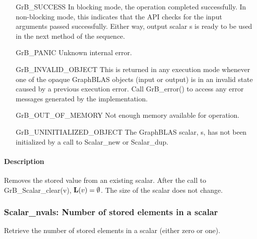 \begin{itemize}[leftmargin=2.1in]
    \item[{\sf GrB\_SUCCESS}]         In blocking mode, the operation completed
    successfully. In non-blocking mode, this indicates that the API checks 
    for the input arguments passed successfully. Either way, output scalar 
    {\sf s} is ready to be used in the next method of the sequence.

    \item[{\sf GrB\_PANIC}]           Unknown internal error.
    
    \item[{\sf GrB\_INVALID\_OBJECT}] This is returned in any execution mode 
    whenever one of the opaque GraphBLAS objects (input or output) is in an invalid 
    state caused by a previous execution error.  Call {\sf GrB\_error()} to access 
    any error messages generated by the implementation.

    \item[{\sf GrB\_OUT\_OF\_MEMORY}] Not enough memory available for operation.
    
    \item[{\sf GrB\_UNINITIALIZED\_OBJECT}]  The GraphBLAS scalar, {\sf s}, has 
    not been initialized by a call to {\sf Scalar\_new} or {\sf Scalar\_dup}.
    
\end{itemize}

\paragraph{Description}

Removes the stored value from an existing scalar. After the call to
{\sf GrB\_Scalar\_clear(v)}, 
$\mathbf{L}({v}) = \emptyset$. The size of the scalar does not change. 


\subsubsection{{\sf Scalar\_nvals}: Number of stored elements in a scalar}
\label{Sec:Scalar_nvals}

Retrieve the number of stored elements in a scalar (either zero or one).

\paragraph{\syntax}

